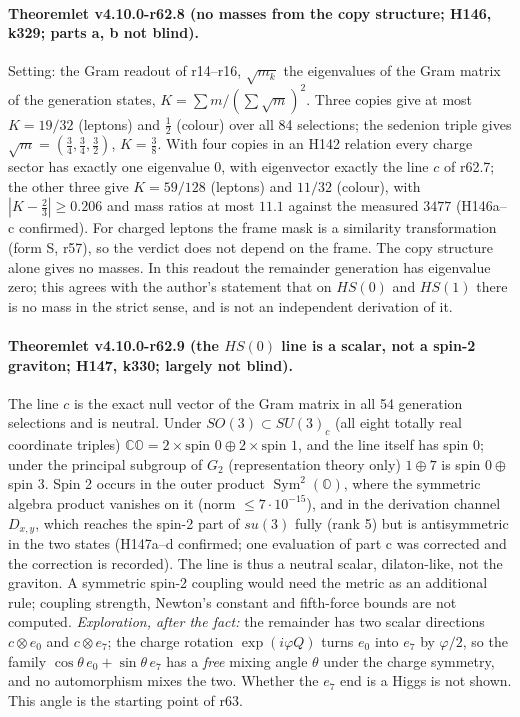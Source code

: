 \paragraph{Theoremlet v4.10.0-r62.8 (no masses from the copy structure; H146, k329; parts a, b not blind).}
Setting: the Gram readout of r14--r16, \(\sqrt{m_k}\) the eigenvalues of the Gram matrix of the generation states,
\(K=\sum m/(\sum\sqrt m)^2\).  Three copies give at most \(K=19/32\) (leptons) and \(\tfrac12\) (colour) over all 84 selections; the sedenion
triple gives \(\sqrt m=(\tfrac34,\tfrac34,\tfrac32)\), \(K=\tfrac38\).  With four copies in an H142 relation every charge sector has exactly one
eigenvalue \(0\), with eigenvector exactly the line \(c\) of r62.7; the other three give \(K=59/128\) (leptons) and \(11/32\) (colour), with
\(|K-\tfrac23|\ge0.206\) and mass ratios at most \(11.1\) against the measured \(3477\) (H146a--c confirmed).  For charged leptons the frame mask
is a similarity transformation (form S, r57), so the verdict does not depend on the frame.  The copy structure alone gives no masses.  In this
readout the remainder generation has eigenvalue zero; this agrees with the author's statement that on \(HS(0)\) and \(HS(1)\) there is no mass in
the strict sense, and is not an independent derivation of it.

\paragraph{Theoremlet v4.10.0-r62.9 (the \(HS(0)\) line is a scalar, not a spin-2 graviton; H147, k330; largely not blind).}
The line \(c\) is the exact null vector of the Gram matrix in all 54 generation selections and is neutral.  Under \(SO(3)\subset SU(3)_c\) (all
eight totally real coordinate triples) \(\mathbb C\mathbb O=2\times\text{spin }0\oplus2\times\text{spin }1\), and the line itself has spin \(0\);
under the principal subgroup of \(G_2\) (representation theory only) \(1\oplus7\) is spin \(0\oplus\) spin \(3\).  Spin 2 occurs in the outer
product \(\operatorname{Sym}^2(\mathbb O)\), where the symmetric algebra product vanishes on it (norm \(\le7\cdot10^{-15}\)), and in the derivation
channel \(D_{x,y}\), which reaches the spin-2 part of \(su(3)\) fully (rank 5) but is antisymmetric in the two states (H147a--d confirmed; one
evaluation of part c was corrected and the correction is recorded).  The line is thus a neutral scalar, dilaton-like, not the graviton.  A
symmetric spin-2 coupling would need the metric as an additional rule; coupling strength, Newton's constant and fifth-force bounds are not
computed.  \emph{Exploration, after the fact:} the remainder has two scalar directions \(c\otimes e_0\) and \(c\otimes e_7\); the charge rotation
\(\exp(i\varphi Q)\) turns \(e_0\) into \(e_7\) by \(\varphi/2\), so the family \(\cos\theta\,e_0+\sin\theta\,e_7\) has a \emph{free} mixing angle
\(\theta\) under the charge symmetry, and no automorphism mixes the two.  Whether the \(e_7\) end is a Higgs is not shown.  This angle is the
starting point of r63.

